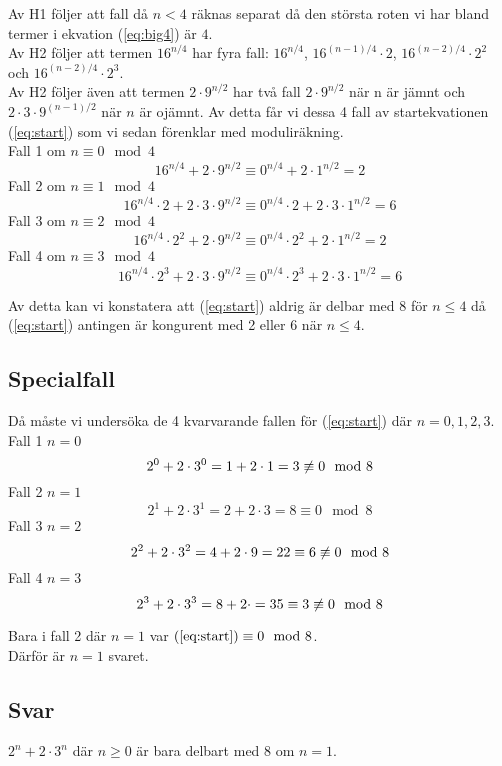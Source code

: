 \documentclass[11pt]{article}
\begin{document}
Av H1 följer att fall då $n < 4$ räknas separat då den största roten vi har bland termer i ekvation (\ref{eq:big4}) är $4$.\\
Av H2 följer att termen $16^{n/4}$ har fyra fall: $16^{n/4}$, $16^{(n-1)/4} \cdot 2$, $16^{(n-2)/4} \cdot 2^2$ och $16^{(n-2)/4} \cdot 2^3$.\\
Av H2 följer även att termen $2 \cdot 9^{n/2}$ har två fall $2 \cdot 9^{n/2}$ när n är jämnt och $2 \cdot 3 \cdot 9^{(n-1)/2}$ när $n$ är ojämnt.
\newpage
Av detta får vi dessa 4 fall av startekvationen (\ref{eq:start}) som vi sedan förenklar med moduliräkning.\\
Fall 1 om $n \equiv 0 \mod 4$
$$
16^{n/4} + 2 \cdot 9^{n/2} \equiv 0^{n/4} + 2 \cdot 1^{n/2} = 2 
$$
Fall 2 om $n \equiv 1 \mod 4$
$$
16^{n/4} \cdot 2 + 2 \cdot 3 \cdot 9^{n/2} \equiv 0^{n/4} \cdot 2 + 2 \cdot 3 \cdot 1^{n/2} = 6 
$$
Fall 3 om $n \equiv 2 \mod 4$
$$
16^{n/4} \cdot 2^2 + 2 \cdot 9^{n/2} \equiv 0^{n/4} \cdot 2^2 + 2 \cdot 1^{n/2} = 2 
$$
Fall 4 om $n \equiv 3 \mod 4$
$$
16^{n/4} \cdot 2^3 + 2 \cdot 3 \cdot 9^{n/2} \equiv 0^{n/4} \cdot 2^3 + 2 \cdot 3 \cdot 1^{n/2} = 6 
$$

Av detta kan vi konstatera att (\ref{eq:start}) aldrig är delbar med 8 för $n \leq 4$ då  (\ref{eq:start}) antingen är kongurent med 2 eller 6 när $n \leq 4$.

\subsection{Specialfall}
Då måste vi undersöka de 4 kvarvarande fallen för (\ref{eq:start}) där $n = 0,1,2,3$.\\
Fall 1 $n = 0$
$$2^0 + 2 \cdot 3^0 = 1 + 2 \cdot 1 = 3 \centernot\equiv 0 \mod 8$$
Fall 2 $n = 1$
$$2^1 + 2 \cdot 3^1 = 2 + 2 \cdot 3 = 8 \equiv 0 \mod 8$$
Fall 3 $n = 2$
$$2^2 + 2 \cdot 3^2 = 4 + 2 \cdot 9 = 22 \equiv 6 \centernot\equiv 0 \mod 8$$
Fall 4 $n = 3$
$$2^3 + 2 \cdot 3^3 = 8 + 2 \cdot  = 35 \equiv 3 \centernot\equiv 0 \mod 8$$

Bara i fall 2 där $n = 1$ var $(\ref{eq:start}) \equiv 0 \mod 8$. \\
Därför är $n=1$ svaret.  

\subsection{Svar}
$2^n + 2 \cdot 3^n$ där $n \geq 0$ är bara delbart med 8 om $n = 1$.
\end{document}
